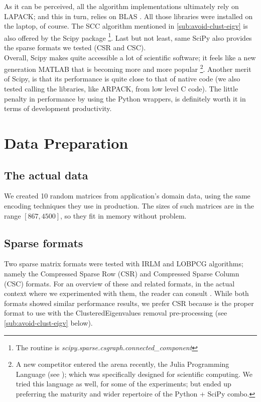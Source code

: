 As it can be perceived, all the algorithm implementations ultimately
rely on LAPACK; and this in turn, relies on BLAS \cite{blas}. All
those libraries were installed on the laptop, of course. The
\gls{SCC} algorithm mentioned in \cref{sub:avoid-clust-eigv} is
also offered by the Scipy package 
\footnote{The routine is
  \emph{scipy.sparse.csgraph.connected\_component}}. Last but not 
least, same SciPy also provides the sparse formats we tested (CSR and CSC). \\

Overall, Scipy makes quite accessible a lot of scientific
software; it feels like a new generation MATLAB that is becoming more
and more popular \footnote{A new competitor entered the arena
  recently, the Julia Programming Language (see \cite{julia}); which
  was specifically
  designed for scientific computing. We tried this language as well,
  for some of the experiments; but ended up preferring the maturity
  and wider repertoire of the Python + SciPy combo.}. Another merit of Scipy,
is that its performance is quite close to that of native code (we
also tested calling the libraries, like ARPACK, from low level C
code). The little penalty in performance by using the Python wrappers,
is definitely worth it in terms of development productivity. 

\section{Data Preparation}

\subsection{The actual data}
We created 10 random matrices from application's domain data, using
the same encoding techniques they use in production. The sizes of such
matrices are in the range $[867,4500]$, so they fit in memory without
problem. \\

\subsection{Sparse formats}
Two sparse matrix formats were tested with \gls{IRLM} and
\gls{LOBPCG} 
algorithms; namely the Compressed Sparse Row (CSR) and Compressed
Sparse Column (CSC) formats. For an overview of these and related
formats, in the actual context where we experimented with them, the
reader can consult \cite{johansson15}. While both formats showed
similar performance results, we prefer CSR because is the proper
format to use with the \gls{ClusteredEigenvalues} removal pre-processing (see
\cref{sub:avoid-clust-eigv} below). 

